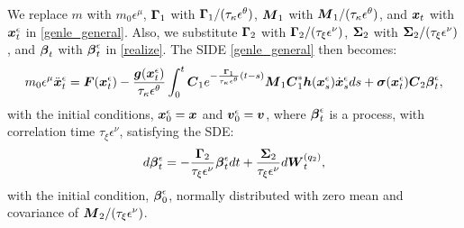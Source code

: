 We replace $m$ with $m_0 \epsilon^\mu$,  $\boldsymbol{\Gamma}_1$ with $\boldsymbol{\Gamma}_1/(\tau_{\kappa} \epsilon^{\theta})$, $\boldsymbol{M}_1$ with $\boldsymbol{M}_1/(\tau_{\kappa} \epsilon^{\theta})$,  and $\boldsymbol{x}_t$ with $\boldsymbol{x}_t^\epsilon$ in \eqref{genle_general}. Also, we substitute  $\boldsymbol{\Gamma}_2$ with $\boldsymbol{\Gamma}_2/(\tau_{\xi} \epsilon^{\nu})$, $\boldsymbol{\Sigma}_2$ with $\boldsymbol{\Sigma}_2/(\tau_{\xi} \epsilon^{\nu})$, and $\boldsymbol{\beta}_t$ with $\boldsymbol{\beta}_t^\epsilon$  in \eqref{realize}. The SIDE \eqref{genle_general} then becomes: 
\begin{equation} \label{general_side_rescaled}
m_0 \epsilon^{\mu} \ddot{\boldsymbol{x}}^{\epsilon}_{t} =  \boldsymbol{F}(\boldsymbol{x}^\epsilon_{t}) - \frac{\boldsymbol{g}(\boldsymbol{x}^\epsilon_{t})}{\tau_{\kappa} \epsilon^{\theta}} \int_{0}^{t} \boldsymbol{C}_1e^{-\frac{\boldsymbol{\Gamma}_1}{\tau_{\kappa}\epsilon^{\theta}}(t-s)} \boldsymbol{M}_1 \boldsymbol{C}_1^* \boldsymbol{h}(\boldsymbol{x}^\epsilon_{s}) \dot{\boldsymbol{x}}^{\epsilon}_{s} ds +  \boldsymbol{\sigma}(\boldsymbol{x}^\epsilon_{t}) \boldsymbol{C}_2 \boldsymbol{\beta}^\epsilon_{t}, 
\end{equation}
with the initial conditions, $\boldsymbol{x}^\epsilon_0 = \boldsymbol{x}$ and $\boldsymbol{v}^\epsilon_0 = \boldsymbol{v}$, where $\boldsymbol{\beta}^\epsilon_t$ is a process, with correlation time $\tau_{\xi} \epsilon^\nu$,  satisfying the SDE: 
\begin{equation} \label{general_rescaled_ou}
d\boldsymbol{\beta}^\epsilon_t = -\frac{\boldsymbol{\Gamma}_2}{\tau_{\xi} \epsilon^\nu} \boldsymbol{\beta}^\epsilon_t dt + \frac{\boldsymbol{\Sigma}_2}{\tau_{\xi} \epsilon^\nu} d\boldsymbol{W}^{(q_2)}_t,
\end{equation}
with the initial condition, $\boldsymbol{\beta}^\epsilon_0$, normally distributed with zero mean and covariance of $\boldsymbol{M}_2/(\tau_{\xi} \epsilon^\nu)$. 

